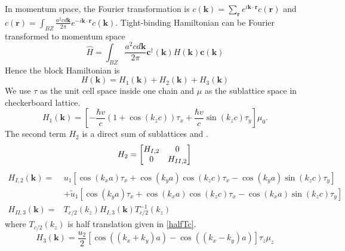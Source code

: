 In momentum space, the Fourier transformation is $c(\mathbf{k})=\sum_{\mathbf{r}}e^{i\mathbf{k}\cdot\mathbf{r}}c(\mathbf{r})$ and  $c(\mathbf{r})=\int_{BZ}\frac{a^2cd\mathbf{k}}{2\pi}e^{-i\mathbf{k}\cdot\mathbf{r}}c(\mathbf{k})$. Tight-binding Hamiltonian can be Fourier transformed to momentum space \begin{equation}
    \hat{H}=\int_{BZ}\frac{a^2cd\mathbf{k}}{2\pi}\mathbf{c}^{\dagger}(\mathbf{k})H(\mathbf{k})\mathbf{c}(\mathbf{k})
\end{equation}
Hence the block Hamiltonian is
\begin{equation}
    H(\mathbf{k})=H_1(\mathbf{k})+H_2(\mathbf{k})+H_3(\mathbf{k})
\end{equation}
We use $\tau$ as the unit cell space inside one chain and $\mu$ as the sublattice space in checkerboard lattice.
\begin{equation}
    H_{1}(\mathbf{k}) = \left[- \frac{\hbar v}{c} (1 + \cos (k_z c) )\tau_x + \frac{\hbar v}{c} \sin(k_z c) \tau_y  \right]\mu_0.
\end{equation}
The second term $H_2$ is a direct sum of sublattices  and . 
\begin{equation}
    H_2 =
    \begin{bmatrix}
    H_{I,2} & 0\\
    0 &H_{II,2}
    \end{bmatrix}\\
\end{equation}
\begin{equation}
    \begin{split}
        H_{I,2}(\mathbf{k})=&u_1 \left[ \cos(k_x a) \tau_x + \cos(k_y a) \cos(k_z c) \tau_x - \cos(k_y a) \sin(k_z c) \tau_y \right] \\ &+ \tilde{u}_1 \left[ \cos(k_y a) \tau_x + \cos(k_x a) \cos(k_z c) \tau_x - \cos(k_x a) \sin(k_z c) \tau_y \right]\\
        H_{II,3} (\mathbf{k}) = &T_{c/2} (k_z)H_{I,3} (\mathbf{k}) T_{c/2}^{-1} (k_z)
    \end{split}
\end{equation}
where $T_{c/2} (k_z)$ is half translation given in \eqref{halfTc}.
\begin{equation}
    H_{3} (\mathbf{k}) = \frac{u_2}{2} \left[ \cos((k_x + k_y)a) - \cos((k_x - k_y)a) \right] \tau_z\mu_z
\end{equation}





